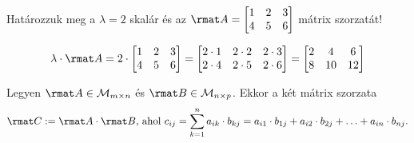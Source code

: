 \begin{example}
  Határozzuk meg a $\lambda = 2$ skalár és az $\rmat A = \begin{bmatrix}
      1 & 2 & 3 \\
      4 & 5 & 6
    \end{bmatrix}$ mátrix szorzatát!

  \hdashrule[.8ex][x]{\dimexpr\textwidth}{1pt}{2mm 3pt}
  $$
    \lambda \cdot \rmat A
    = 2 \cdot
    \begin{bmatrix}
      1 & 2 & 3 \\
      4 & 5 & 6
    \end{bmatrix}
    =
    \begin{bmatrix}
      2 \cdot 1 & 2 \cdot 2 & 2 \cdot 3 \\
      2 \cdot 4 & 2 \cdot 5 & 2 \cdot 6
    \end{bmatrix}
    =
    \begin{bmatrix}
      2 & 4  & 6  \\
      8 & 10 & 12
    \end{bmatrix}
  $$
\end{example}

\begin{definition}
  Legyen $\rmat A \in \mathcal M_{m \times n}$ és
  $\rmat B \in \mathcal M_{n \times p}$. Ekkor a két mátrix szorzata
  $$
    \rmat C := \rmat A \cdot \rmat B
    \text{, ahol }
    c_{ij}
    = \sum_{k=1}^{n} a_{ik} \cdot b_{kj}
    = a_{i1} \cdot b_{1j} + a_{i2} \cdot b_{2j} + \ldots + a_{in} \cdot b_{nj}
    \text.
  $$
\end{definition}

